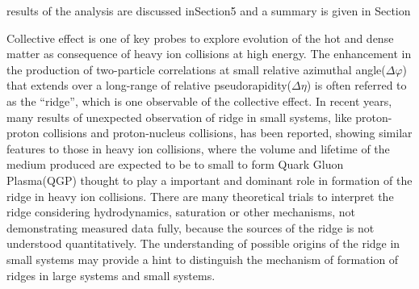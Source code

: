 \documentclass[ALICE,manyauthors]{cernphprep}
\begin{document}
results of the analysis are discussed inSection5 and a summary is given in Section

Collective effect is one of key probes to explore evolution of the hot and dense matter as consequence of heavy ion collisions at high energy. The enhancement in the production of two-particle correlations at small relative azimuthal angle($\Delta\varphi$) that extends over a long-range of relative pseudorapidity($\Delta\eta$) is often referred to as the “ridge”, which is one observable of the collective effect. In recent years, many results of unexpected observation of ridge in small systems, like proton-proton collisions and proton-nucleus collisions, has been reported, showing similar features to those in heavy ion collisions, where the volume and lifetime of the medium produced are expected to be to small to form Quark Gluon Plasma(QGP) thought to play a important and dominant role in formation of the ridge in heavy ion collisions. There are many theoretical trials to interpret the ridge considering hydrodynamics, saturation or other mechanisms, not demonstrating measured data fully, because the sources of the ridge is not understood quantitatively. The understanding of possible origins of the ridge in small systems may provide a hint to distinguish the mechanism of formation of ridges in large systems and small systems.

\end{document}
